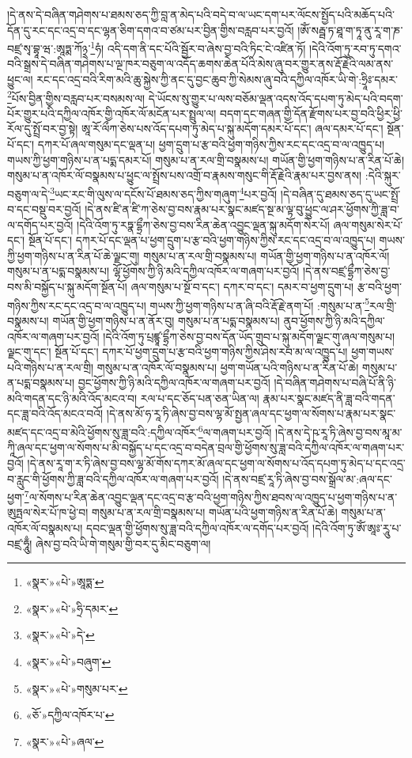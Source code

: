 །དེ་ནས་དེ་བཞིན་གཤེགས་པ་ཐམས་ཅད་ཀྱི་བླ་ན་མེད་པའི་བདེ་བ་ལ་ཡང་དག་པར་ལོངས་སྤྱོད་པའི་མཆོད་པའི་དོན་དུ་རང་དང་འདྲ་བ་དང་ལྷན་ཅིག་དགའ་བ་ཙམ་པར་བྱིན་གྱིས་བརླབ་པར་བྱའོ། །ཨོཾ་སརྦྦ་ཏ་ཐཱ་ག་ཏཱ་ནུ་རཱ་ག་ཎ་བཛྲ་སྭ་བྷཱ་ཝ་:ཨཱཏྨ་ཀོ྅་\footnote{«སྣར་»«པེ་»ཨཱཏྨ་}ཧཾ། འདི་དག་ནི་དང་པོའི་སྦྱོར་བ་ཞེས་བྱ་བའི་ཏིང་ངེ་འཛིན་ཏོ། །དེའི་འོག་ཏུ་རབ་ཏུ་དགའ་བའི་སྒྲས་དེ་བཞིན་གཤེགས་པ་ལྔ་ཁར་བཅུག་ལ་འདོད་ཆགས་ཆེན་པོའི་མེས་ཞུ་བར་གྱུར་ནས་རྡོ་རྗེའི་ལམ་ནས་ཕྱུང་ལ། རང་དང་འདྲ་བའི་རིག་མའི་ཆུ་སྐྱེས་ཀྱི་ནང་དུ་བྱང་ཆུབ་ཀྱི་སེམས་ཞུ་བའི་དཀྱིལ་འཁོར་ཡི་གེ་:ཧྲཱིཿ་དམར་\footnote{«སྣར་»«པེ་»ཧྲི་དམར་}པོས་བྱིན་གྱིས་བརླབ་པར་བསམས་ལ། དེ་ཡོངས་སུ་གྱུར་པ་ལས་བཅོམ་ལྡན་འདས་འོད་དཔག་ཏུ་མེད་པའི་བདག་པོར་གྱུར་པའི་དཀྱིལ་འཁོར་གྱི་འཁོར་ལོ་མངོན་པར་སྤྲུལ་ལ། བདག་དང་གཞན་གྱི་དོན་རྫོགས་པར་བྱ་བའི་ཕྱིར་ཕྱི་རོལ་དུ་སྤྲོ་བར་བྱ་སྟེ། ཨཱ་རོ་ལྀཀ་ཅེས་པས་འོད་དཔག་ཏུ་མེད་པ་སྐུ་མདོག་དམར་པོ་དང་། ཞལ་དམར་པོ་དང་། སྔོན་པོ་དང་། དཀར་པོ་ཞལ་གསུམ་དང་ལྡན་པ། ཕྱག་དྲུག་པ་རྩ་བའི་ཕྱག་གཉིས་ཀྱིས་རང་དང་འདྲ་བ་ལ་འཁྱུད་པ། གཡས་ཀྱི་ཕྱག་གཉིས་པ་ན་པདྨ་དམར་པོ། གསུམ་པ་ན་རལ་གྲི་བསྣམས་པ། གཡོན་གྱི་ཕྱག་གཉིས་པ་ན་རིན་པོ་ཆེ། གསུམ་པ་ན་འཁོར་ལོ་བསྣམས་པ་ཕྱུང་ལ་སྤྲོས་པས་འགྲོ་བ་རྣམས་གསུང་གི་རྡོ་རྗེའི་རྣམ་པར་བྱས་ནས། :དེའི་སྐུར་བཅུག་ལ་དེ་\footnote{«སྣར་»«པེ་»དེ་}ཡང་རང་གི་ལུས་ལ་དངོས་པོ་ཐམས་ཅད་ཀྱིས་གཞུག་\footnote{«སྣར་»«པེ་»བཞུག་}པར་བྱའོ། །དེ་བཞིན་དུ་ཐམས་ཅད་དུ་ཡང་སྤྲོ་བ་དང་བསྡུ་བར་བྱའོ། །དེ་ནས་ཛི་ན་ཛི་ཀ་ཅེས་བྱ་བས་རྣམ་པར་སྣང་མཛད་སྔ་མ་ལྟ་བུ་ཕྱུང་ལ་ཤར་ཕྱོགས་ཀྱི་ཟླ་བ་ལ་དགོད་པར་བྱའོ། །དེའི་འོག་ཏུ་རཏྣ་དྷྲྀཀ་ཅེས་བྱ་བས་རིན་ཆེན་འབྱུང་ལྡན་སྐུ་མདོག་སེར་པོ། ཞལ་གསུམ་སེར་པོ་དང་། སྔོན་པོ་དང་། དཀར་པོ་དང་ལྡན་པ་ཕྱག་དྲུག་པ་རྩ་བའི་ཕྱག་གཉིས་ཀྱིས་རང་དང་འདྲ་བ་ལ་འཁྱུད་པ། གཡས་ཀྱི་ཕྱག་གཉིས་པ་ན་རིན་པོ་ཆེ་ལྗང་གུ། གསུམ་པ་ན་རལ་གྲི་བསྣམས་པ། གཡོན་གྱི་ཕྱག་གཉིས་པ་ན་འཁོར་ལོ། གསུམ་པ་ན་པདྨ་བསྣམས་པ། ལྷོ་ཕྱོགས་ཀྱི་ཉི་མའི་དཀྱིལ་འཁོར་ལ་གཞག་པར་བྱའོ། །དེ་ནས་བཛྲ་དྷྲྀཀ་ཅེས་བྱ་བས་མི་བསྐྱོད་པ་སྐུ་མདོག་སྔོན་པོ། ཞལ་གསུམ་པ་སྔོ་བ་དང་། དཀར་བ་དང་། དམར་བ་ཕྱག་དྲུག་པ། རྩ་བའི་ཕྱག་གཉིས་ཀྱིས་རང་དང་འདྲ་བ་ལ་འཁྱུད་པ། གཡས་ཀྱི་ཕྱག་གཉིས་པ་ན་ཞི་བའི་རྡོ་རྗེ་ནག་པོ། :གསུམ་པ་ན་\footnote{«སྣར་»«པེ་»གསུམ་པར་}རལ་གྲི་བསྣམས་པ། གཡོན་གྱི་ཕྱག་གཉིས་པ་ན་ནོར་བུ། གསུམ་པ་ན་པདྨ་བསྣམས་པ། ནུབ་ཕྱོགས་ཀྱི་ཉི་མའི་དཀྱིལ་འཁོར་ལ་གཞག་པར་བྱའོ། །དེའི་འོག་ཏུ་པྲཛྙཱ་དྷྲྀཀ་ཅེས་བྱ་བས་དོན་ཡོད་གྲུབ་པ་སྐུ་མདོག་ལྗང་གུ་ཞལ་གསུམ་པ། ལྗང་གུ་དང་། སྔོན་པོ་དང་། དཀར་པོ་ཕྱག་དྲུག་པ་རྩ་བའི་ཕྱག་གཉིས་ཀྱིས་ཤེས་རབ་མ་ལ་འཁྱུད་པ། ཕྱག་གཡས་པའི་གཉིས་པ་ན་རལ་གྲི། གསུམ་པ་ན་འཁོར་ལོ་བསྣམས་པ། ཕྱག་གཡོན་པའི་གཉིས་པ་ན་རིན་པོ་ཆེ། གསུམ་པ་ན་པདྨ་བསྣམས་པ། བྱང་ཕྱོགས་ཀྱི་ཉི་མའི་དཀྱིལ་འཁོར་ལ་གཞག་པར་བྱའོ། །དེ་བཞིན་གཤེགས་པ་བཞི་པོ་ནི་ཉི་མའི་གདན་དང་ཉི་མའི་འོད་མངའ་བ། རལ་པ་དང་ཅོད་པན་ཅན་ཡིན་ལ། རྣམ་པར་སྣང་མཛད་ནི་ཟླ་བའི་གདན་དང་ཟླ་བའི་འོད་མངའ་བའོ། །དེ་ནས་མོ་ཧ་རཱ་ཏི་ཞེས་བྱ་བས་ལྷ་མོ་སྤྱན་ཞལ་དང་ཕྱག་ལ་སོགས་པ་རྣམ་པར་སྣང་མཛད་དང་འདྲ་བ་མེའི་ཕྱོགས་སུ་ཟླ་བའི་:དཀྱིལ་འཁོར་\footnote{«ཅོ་»དཀྱིལ་འཁོར་པ་}ལ་གཞག་པར་བྱའོ། །དེ་ནས་དྭེ་ཥ་རཱ་ཏི་ཞེས་བྱ་བས་མཱ་མ་ཀཱི་ཞལ་དང་ཕྱག་ལ་སོགས་པ་མི་བསྐྱོད་པ་དང་འདྲ་བ་བདེན་བྲལ་གྱི་ཕྱོགས་སུ་ཟླ་བའི་དཀྱིལ་འཁོར་ལ་གཞག་པར་བྱའོ། །དེ་ནས་རཱ་ག་ར་ཏི་ཞེས་བྱ་བས་ལྷ་མོ་གོས་དཀར་མོ་ཞལ་དང་ཕྱག་ལ་སོགས་པ་འོད་དཔག་ཏུ་མེད་པ་དང་འདྲ་བ་རླུང་གི་ཕྱོགས་ཀྱི་ཟླ་བའི་དཀྱིལ་འཁོར་ལ་གཞག་པར་བྱའོ། །དེ་ནས་བཛྲ་རཱ་ཏི་ཞེས་བྱ་བས་སྒྲོལ་མ་:ཞལ་དང་ཕྱག་\footnote{«སྣར་»«པེ་»ཞལ་}ལ་སོགས་པ་རིན་ཆེན་འབྱུང་ལྡན་དང་འདྲ་བ་རྩ་བའི་ཕྱག་གཉིས་ཀྱིས་ཐབས་ལ་འཁྱུད་པ་ཕྱག་གཉིས་པ་ན་ཨུཏྤལ་སེར་པོ་ཁ་ཕྱེ་བ། གསུམ་པ་ན་རལ་གྲི་བསྣམས་པ། གཡོན་པའི་ཕྱག་གཉིས་ན་རིན་པོ་ཆེ། གསུམ་པ་ན་འཁོར་ལོ་བསྣམས་པ། དབང་ལྡན་གྱི་ཕྱོགས་སུ་ཟླ་བའི་དཀྱིལ་འཁོར་ལ་དགོད་པར་བྱའོ། །དེའི་འོག་ཏུ་ཨོཾ་ཨཱཿ་རཱུ་པ་བཛྲ་ཧཱུྃ། ཞེས་བྱ་བའི་ཡི་གེ་གསུམ་གྱི་བར་དུ་མིང་བཅུག་ལ། 